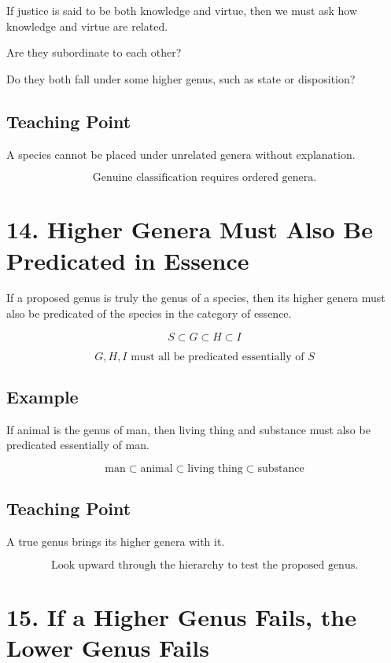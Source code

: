 \documentclass[12pt]{article}
\begin{document}
If justice is said to be both knowledge and virtue, then we must ask how
knowledge and virtue are related.

Are they subordinate to each other?

Do they both fall under some higher genus, such as state or disposition?

\subsection*{Teaching Point}

A species cannot be placed under unrelated genera without explanation.

\[
\boxed{
\text{Genuine classification requires ordered genera.}
}
\]

\section*{14. Higher Genera Must Also Be Predicated in Essence}

If a proposed genus is truly the genus of a species, then its higher genera must
also be predicated of the species in the category of essence.

\[
S \subset G \subset H \subset I
\]

\[
G,H,I \text{ must all be predicated essentially of } S
\]

\subsection*{Example}

If animal is the genus of man, then living thing and substance must also be
predicated essentially of man.

\[
\text{man} \subset \text{animal} \subset \text{living thing} \subset \text{substance}
\]

\subsection*{Teaching Point}

A true genus brings its higher genera with it.

\[
\boxed{
\text{Look upward through the hierarchy to test the proposed genus.}
}
\]

\section*{15. If a Higher Genus Fails, the Lower Genus Fails}
\end{document}
